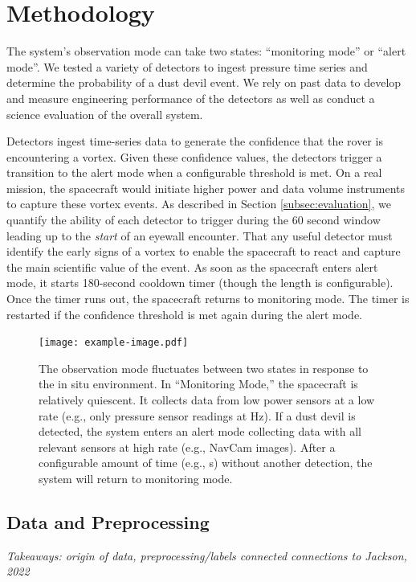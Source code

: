 \section{Methodology}

The system's observation mode can take two states: ``monitoring mode'' or ``alert mode''. 
We tested a variety of detectors to ingest pressure time series and determine the probability of a dust devil event. 
We rely on past data to develop and measure engineering performance of the detectors as well as conduct a science evaluation of the overall system.

Detectors ingest time-series data to generate the confidence that the rover is encountering a vortex.
Given these confidence values, the detectors trigger a transition to the alert mode when a configurable threshold is met. 
On a real mission, the spacecraft would initiate higher power and data volume instruments to capture these vortex events.
As described in Section \ref{subsec:evaluation}, we quantify the ability of each detector to trigger during the 60 second window leading up to the \textit{start} of an eyewall encounter. 
That any useful detector must identify the early signs of a vortex to enable the spacecraft to react and capture the main scientific value of the event.
As soon as the spacecraft enters alert mode, it starts 180-second cooldown timer (though the length is configurable). 
Once the timer runs out, the spacecraft returns to monitoring mode. 
The timer is restarted if the confidence threshold is met again during the alert mode.

\begin{figure}
    \centering
    \texttt{[image: example-image.pdf]}
    \caption{The observation mode fluctuates between two states in response to the in situ environment. In ``Monitoring Mode,'' the spacecraft is relatively quiescent. It collects data from low power sensors at a low rate (e.g., only pressure sensor readings at \unit[1]{Hz}). If a dust devil is detected, the system enters an alert mode collecting data with all relevant sensors at high rate (e.g., NavCam images). After a configurable amount of time (e.g., \unit[60]{s}) without another detection, the system will return to monitoring mode.}
    \label{fig:Population_Weighted_Dust_Flux}
\end{figure}

\subsection{Data and Preprocessing}\label{subsection:data}
\textit{Takeaways: origin of data, preprocessing/labels connected connections to Jackson, 2022}

